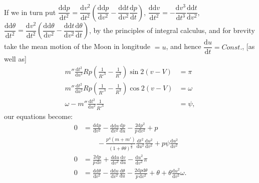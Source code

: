 \par\noindent If we in turn put
\(\dfrac{\mathrm{dd}p}{\mathrm{d}t^2}
 =\dfrac{\mathrm{d}v^2}{\mathrm{d}t^2}
 \left(\dfrac{\mathrm{dd}p}{\mathrm{d}v^2}
 -\dfrac{\mathrm{dd}t}{\mathrm{d}v^2}\dfrac{\mathrm{d}p}{\mathrm{d}t}\right)\),
\(\dfrac{\mathrm{dd}v}{\mathrm{d}t^2}
 =-\dfrac{\mathrm{d}v^3}{\mathrm{d}t^3}
 \dfrac{\mathrm{dd}t}{\mathrm{d}v^2}\),
\(\dfrac{\mathrm{dd}\theta}{\mathrm{d}t^2}
 =\dfrac{\mathrm{d}v^2}{\mathrm{d}t^2}
 \left(\dfrac{\mathrm{dd}\theta}{\mathrm{d}v^2}
 -\dfrac{\mathrm{dd}t}{\mathrm{d}v^2}\dfrac{\mathrm{d}\theta}{\mathrm{d}t}\right)\),
by the principles of integral calculus, and for brevity take the mean motion
of the Moon in longitude \(=u\), and hence
\(\dfrac{\mathrm{d}u}{\mathrm{d}t}=\mathit{Const.}\), [as well as]
\[
\begin{aligned}
m''\frac{\mathrm{d}t^2}{\mathrm{d}u^2}Rp
 \left(\frac{1}{R'^3}-\frac{1}{R^3}\right)\sin 2(v-V)&=\pi\\[5pt]
m''\frac{\mathrm{d}t^2}{\mathrm{d}u^2}Rp
 \left(\frac{1}{R'^3}-\frac{1}{R^3}\right)\cos 2(v-V)&=\omega\\[5pt]
\omega-m''\frac{\mathrm{d}t^2}{\mathrm{d}u^2}\frac{1}{R'^3}&=\psi,
\end{aligned}
\]
\noindent our equations become:
\[
\begin{aligned}
0&=\frac{\mathrm{dd}p}{\mathrm{d}v^2}
  -\frac{\mathrm{dd}u}{\mathrm{d}v^2}\frac{\mathrm{d}p}{\mathrm{d}u}
  -\frac{2\mathrm{d}p^2}{p\,\mathrm{d}v^2}+p\\
 &\qquad-\frac{p^4(m+m')}{(1+\theta\theta)^{\frac{3}{2}}}
  \frac{\mathrm{d}t^2}{\mathrm{d}u^2}\frac{\mathrm{d}u^2}{\mathrm{d}v^2}
  +p\psi\frac{\mathrm{d}u^2}{\mathrm{d}v^2}\\[5pt]
0&=\frac{2\mathrm{d}p}{p\,\mathrm{d}v}
  +\frac{\mathrm{dd}u}{\mathrm{d}v^2}\frac{\mathrm{d}v}{\mathrm{d}u}
  -\frac{\mathrm{d}u^2}{\mathrm{d}v^2}\pi\\[5pt]
0&=\frac{\mathrm{dd}\theta}{\mathrm{d}v^2}
  -\frac{\mathrm{dd}u}{\mathrm{d}v^2}\frac{\mathrm{d}\theta}{\mathrm{d}u}
  -\frac{2\mathrm{d}p\mathrm{d}\theta}{p\,\mathrm{d}v^2}
  +\theta+\theta\frac{\mathrm{d}u^2}{\mathrm{d}v^2}\omega.
\end{aligned}
\]

